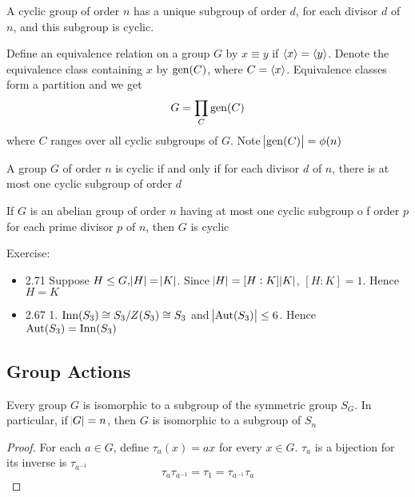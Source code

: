 \documentclass[11pt]{article}
\begin{document}
\begin{lemma}[]
A cyclic group of order \(n\) has a unique subgroup of order \(d\), for each
divisor \(d\) of \(n\), and this subgroup is cyclic.
\end{lemma}

Define an equivalence relation on a group \(G\) by \(x\equiv y\) if \(\langle x\rangle=\langle
   y\rangle\). Denote the equivalence class containing \(x\) by \(\operatorname{gen}(C)\), where \(C=\langle
   x\rangle\). Equivalence classes form a partition and we get
\begin{equation*}
G=\displaystyle\prod_{C}\operatorname{gen}(C)
\end{equation*}
where \(C\) ranges over all cyclic subgroups of \(G\). Note \(\abs{\operatorname{gen}(C)}=\phi(n)\)

\begin{theorem}[]
A group \(G\) of order \(n\) is cyclic if and only if for each divisor \(d\) of
\(n\), there is at most one cyclic subgroup of order \(d\)
\end{theorem}

\begin{theorem}[]
   If \(G\) is an abelian group of order \(n\) having at most one cyclic subgroup o
f
   order \(p\) for each prime divisor \(p\) of \(n\), then \(G\) is cyclic
\end{theorem}

Exercise:
\begin{itemize}
\item 2.71 Suppose \(H\le G, \abs{H}=\abs{K}\). Since \(\abs{H}=[H:K]\abs{K}\),
\([H:K]=1\). Hence \(H=K\)
\item 2.67 1. \(\operatorname{Inn}(S_3)\cong S_3/Z(S_3)\cong S_3\) and \(\abs{\operatorname{Aut}(S_3)}\le 6\).
Hence \(\operatorname{Aut}(S_3)=\operatorname{Inn}(S_3)\)
\end{itemize}
\subsection{Group Actions}
\label{sec:org47c8136}
\begin{theorem}[Cayley]
Every group \(G\) is isomorphic to a subgroup of the symmetric group \(S_G\). In
particular, if \(\abs{G}=n\), then \(G\) is isomorphic to a subgroup of \(S_n\)
\end{theorem}

\begin{proof}
For each \(a\in G\), define \(\tau_a(x)=ax\) for every \(x\in G\). \(\tau_a\) is a
bijection for its inverse is \(\tau_{a^{-1}}\)
\begin{equation*}
\tau_a\tau_{a^{-1}}=\tau_1=\tau_{a^{-1}}\tau_a
\end{equation*}
\end{proof}
\end{document}
